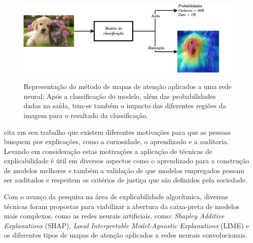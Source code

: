 \begin{figure}[htbp]
	\centering
	\caption[Representação do método de mapas de atenção aplicados a uma rede neural]{Representação do método de mapas de atenção aplicados a uma rede neural: Após a classificação do modelo, além das probabilidades dadas na saída, tem-se também o impacto das diferentes regiões da imagem para o resultado da classificação.}
		\includegraphics[scale=.28]{imagens/mapa-de-atencao.png}
	\label{fig:mapa-de-atencao}
\end{figure}

 cita em seu trabalho que existem diferentes motivações para que as pessoas busquem por explicações, como a curiosidade, o aprendizado e a auditoria. Levando em consideração estas motivações a aplicação de técnicas de explicabilidade é útil em diversos aspectos como o aprendizado para a construção de modelos melhores e também a validação de que modelos empregados possam ser auditados e respeitem os critérios de justiça que são definidos pela sociedade.

Com o avanço da pesquisa na área de explicabilidade algorítmica, diversas técnicas foram propostas para viabilizar a abertura da caixa-preta de modelos mais complexos, como as redes neurais artificiais, como: \textit{Shapley Additive Explanations} (SHAP)\cite{lundbergUnifiedApproachInterpreting2017}, \textit{Local Interpretable Model-Agnostic Explanations} (LIME)\cite{ribeiroWhyShouldTrust2016} e os diferentes tipos de mapas de atenção aplicados a redes neurais convolucionais\cite{selvarajuGradCAMVisualExplanations2017}\cite{chattopadhayGradCAMGeneralizedGradientBased2018}\cite{banymuhammadEigenCAMVisualExplanations2021}.